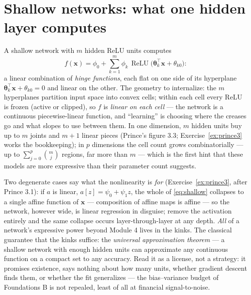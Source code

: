 \documentclass[11pt]{article}
\numberwithin{equation}{section}
\theoremstyle{plain}
\theoremstyle{definition}
\theoremstyle{remark}
\DeclareMathOperator{\ReLU}{ReLU}
\newcommand{\x}{\bm{x}}
\newcommand{\T}{\top}
\begin{document}
\section{Shallow networks: what one hidden layer computes}\label{sec:shallow}

A shallow network with $m$ hidden ReLU units computes
\begin{equation}
f(\x) = \phi_0 + \sum_{k=1}^{m} \phi_k\, \ReLU\big( \bm\theta_k^\T \x + \theta_{k0} \big):
\label{eq:shallow}
\end{equation}
a linear combination of \emph{hinge functions}, each flat on one side of its hyperplane $\bm\theta_k^\T\x + \theta_{k0} = 0$ and linear on the other. The geometry to internalize: the $m$ hyperplanes partition input space into convex cells; within each cell every ReLU is frozen (active or clipped), so $f$ is \emph{linear on each cell} --- the network is a continuous piecewise-linear function, and ``learning'' is choosing where the creases go and what slopes to use between them. In one dimension, $m$ hidden units buy up to $m$ joints and $m+1$ linear pieces (Prince's figure 3.3; Exercise~\ref{ex:prince3} works the bookkeeping); in $p$ dimensions the cell count grows combinatorially --- up to $\sum_{j=0}^{p}\binom{m}{j}$ regions, far more than $m$ --- which is the first hint that these models are more expressive than their parameter count suggests.

Two degenerate cases say what the nonlinearity is \emph{for} (Exercise~\ref{ex:prince3}, after Prince 3.1): if $a$ is linear, $a[z] = \psi_0 + \psi_1 z$, the whole of \eqref{eq:shallow} collapses to a single affine function of $\x$ --- composition of affine maps is affine --- so the network, however wide, is linear regression in disguise; remove the activation entirely and the same collapse occurs layer-through-layer at any depth. \emph{All} of a network's expressive power beyond Module 4 lives in the kinks. The classical guarantee that the kinks suffice: the \emph{universal approximation theorem} --- a shallow network with enough hidden units can approximate any continuous function on a compact set to any accuracy. Read it as a license, not a strategy: it promises existence, says nothing about how many units, whether gradient descent finds them, or whether the fit generalizes --- the bias--variance budget of Foundations B is not repealed, least of all at financial signal-to-noise.
\end{document}

